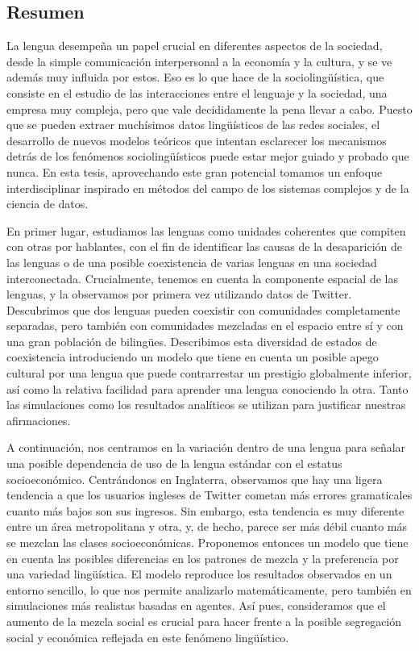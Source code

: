 \documentclass[../thesis.tex]{subfiles}
\begin{document}
\begin{es}
\chapter*{Resumen}
La lengua desempeña un papel crucial en diferentes aspectos de la sociedad, desde la simple comunicación interpersonal a la economía y la cultura, y se ve además muy influida por estos.
Eso es lo que hace de la sociolingüística, que consiste en el
estudio de las interacciones entre el lenguaje y la sociedad, una empresa muy
compleja, pero que vale decididamente la pena llevar a cabo. Puesto que se pueden extraer
muchísimos datos lingüísticos de las redes sociales, el desarrollo de nuevos modelos
teóricos que intentan esclarecer los mecanismos detrás de los fenómenos sociolingüísticos
puede estar mejor guiado y probado que nunca. En esta tesis, aprovechando este gran
potencial tomamos un enfoque interdisciplinar inspirado en métodos del campo de
los sistemas complejos y de la ciencia de datos.

En primer lugar, estudiamos las lenguas como unidades coherentes que compiten con otras
por hablantes, con el fin de identificar las causas de la desaparición de las lenguas o de
una posible coexistencia de varias lenguas en una sociedad interconectada. Crucialmente,
tenemos en cuenta la componente espacial de las lenguas, y la observamos por primera
vez utilizando datos de Twitter. Descubrimos que dos lenguas pueden coexistir con
comunidades completamente separadas, pero también con comunidades mezcladas en el
espacio entre sí y con una gran población de bilingües. Describimos esta diversidad de estados de
coexistencia introduciendo un modelo que tiene en cuenta un posible apego cultural por
una lengua que puede contrarrestar un prestigio globalmente inferior, así como la
relativa facilidad para aprender una lengua conociendo la otra. Tanto las simulaciones
como los resultados analíticos se utilizan para justificar nuestras afirmaciones. 

A continuación, nos centramos en la variación dentro de una lengua para señalar una
posible dependencia de uso de la lengua estándar con el estatus socioeconómico.
Centrándonos en Inglaterra, observamos que hay una ligera tendencia a que los usuarios
ingleses de Twitter cometan más errores gramaticales cuanto más bajos son sus ingresos.
Sin embargo, esta tendencia es muy diferente entre un área metropolitana y otra, y, de
hecho, parece ser más débil cuanto más se mezclan las clases socioeconómicas. Proponemos
entonces un modelo que tiene en cuenta las posibles diferencias en los patrones de
mezcla y la preferencia por una variedad lingüística. El modelo reproduce los resultados observados en un entorno sencillo, lo que nos permite analizarlo matemáticamente, pero
también en simulaciones más realistas basadas en agentes. Así pues, consideramos que el
aumento de la mezcla social es crucial para hacer frente a la posible segregación social
y económica reflejada en este fenómeno lingüístico.


\end{es}
\end{document}
